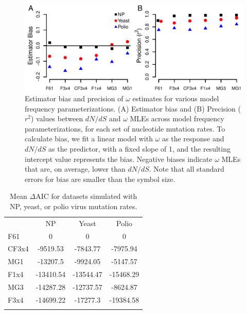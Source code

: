 \documentclass[11pt]{article}
\begin{document}
\begin{figure}[htbp]
	\centerline{\includegraphics[width=12cm]{figures/MainText/nyp_bias_r2.pdf}}
	\caption{\label{nyp_bias_r2} Estimator bias and precision of $\omega$ estimates for various model frequency parameterizations. (A) Estimator bias and (B) Precision ($r^2$) values between $dN/dS$ and $\omega$ MLEs across model frequency parameterizations, for each set of nucleotide mutation rates. To calculate bias, we fit a linear model with $\omega$ as the response and $dN/dS$ as the predictor, with a fixed slope of 1, and the resulting intercept value represents the bias. Negative biases indicate $\omega$ MLEs that are, on average, lower than $dN/dS$. Note that all standard errors for bias are smaller than the symbol size.}	
\end{figure}

\vspace{2cm}


\begin{table}[htbp]
	\caption {\label{tab:dAIC} Mean $\Delta$AIC for datasets simulated with NP, yeast, or polio virus mutation rates.}
	\begin{tabular}{l c c c}
		\hline\noalign{\smallskip}
		\multicolumn{1}{c}{Frequencies} & NP & Yeast & Polio \\
		\noalign{\smallskip}\hline\noalign{\smallskip}
              F61 & 0 & 0 & 0 \\ 
              CF3x4 & -9519.53 & -7843.77 & -7975.94 \\ 
              MG1 & -13207.5 & -9924.05 & -5147.57 \\ 
              F1x4 & -13410.54 & -13544.47 & -15468.29 \\ 
              MG3 & -14287.28 & -12737.57 & -8624.87 \\ 
              F3x4 & -14699.22 & -17277.3 & -19384.58 \\ 
		\noalign{\smallskip}\hline\noalign{\smallskip} 	
	\end{tabular}

\end{table}
\end{document}
